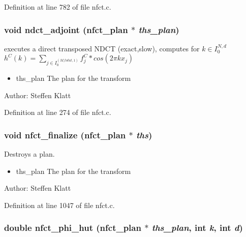 Definition at line 782 of file nfct.c.\hypertarget{group__nfsct_g6343be73aa6b3c75ba04de78074449a8}{
\subsubsection{\setlength{\rightskip}{0pt plus 5cm}void ndct\_\-adjoint ({\bf nfct\_\-plan} $\ast$ {\em ths\_\-plan})}}
\label{group__nfsct_g6343be73aa6b3c75ba04de78074449a8}


executes a direct transposed NDCT (exact,slow), computes for $k \in I_0^{N,d}$ $h^C(k) = \sum_{j \in I_0^{(M\_total,1)}} f_j^C * cos(2 \pi k x_j)$ 

\begin{itemize}
\item ths\_\-plan The plan for the transform\end{itemize}
\begin{Desc}
\item[Author:]Steffen Klatt \end{Desc}


Definition at line 274 of file nfct.c.\hypertarget{group__nfsct_g5613906eb739a977bd862fbdb25224f6}{
\subsubsection{\setlength{\rightskip}{0pt plus 5cm}void nfct\_\-finalize ({\bf nfct\_\-plan} $\ast$ {\em ths})}}
\label{group__nfsct_g5613906eb739a977bd862fbdb25224f6}


Destroys a plan. 

\begin{itemize}
\item ths\_\-plan The plan for the transform\end{itemize}
\begin{Desc}
\item[Author:]Steffen Klatt \end{Desc}


Definition at line 1047 of file nfct.c.\hypertarget{group__nfsct_g10982ac173900c44e0317a8fb01e53c1}{
\subsubsection{\setlength{\rightskip}{0pt plus 5cm}double nfct\_\-phi\_\-hut ({\bf nfct\_\-plan} $\ast$ {\em ths\_\-plan}, int {\em k}, int {\em d})}}
\label{group__nfsct_g10982ac173900c44e0317a8fb01e53c1}


